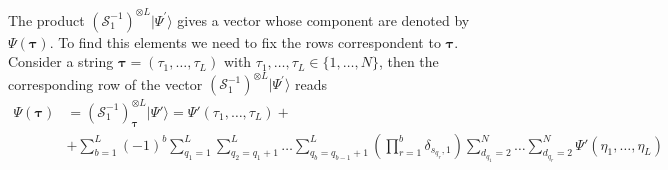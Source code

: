 \documentclass[11pt]{article}
\numberwithin{equation}{section}
\numberwithin{equation}{subsection}
\begin{document}

The product $\left(\mathcal{S}_{1}^{-1}\right)^{\otimes L}|\Psi^{'}\rangle$ gives a vector whose component are denoted by $\Psi(\bm{\tau})$. 
To find this elements we need to fix the rows correspondent to $\bm{\tau}$. Consider a string $\bm{\tau}=(\tau_{1},\ldots,\tau_{L})$ with $\tau_{1},\ldots,\tau_{L}\in \{1,\ldots,N\}$, then the corresponding row of the vector $\left(\mathcal{S}_{1}^{-1}\right)^{\otimes L}|\Psi^{'}\rangle$ reads
\begin{equation}
    \begin{split}
       \Psi(\bm{\tau}) &=\left(\mathcal{S}_{1}^{-1}\right)^{\otimes L}_{\bm{\tau}}|\Psi{'}\rangle=\Psi{'}(\tau_{1},\ldots,\tau_{L})+ 
        \\&
        +\sum_{b=1}^{L}(-1)^{b}\sum_{q_{1}=1}^{L}\sum_{q_{2}=q_{1}+1}^{L}\ldots\sum_{q_{b}=q_{b-1}+1}^{L}\left(\prod_{r=1}^{b}\delta_{s_{q_{r}},1}\right)\sum_{d_{q_{1}}=2}^{N}\ldots\sum_{d_{q_{r}}=2}^{N}\Psi{'}(\eta_{1},\ldots,\eta_{L})
    \end{split}
\end{equation}
\end{document}
